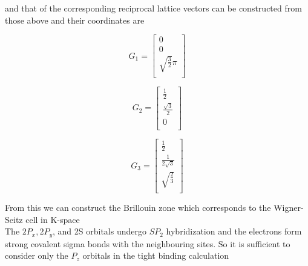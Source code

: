 \documentclass[a4paper]{article}
\begin{document}
    and that of the corresponding reciprocal lattice vectors can be constructed from those above and their coordinates are \\
    \begin{minipage}{0.3\textwidth}
        \centering
        \begin{equation*}
        G_1 =
        \begin{bmatrix}
            0 \\
            0 \\
            \sqrt{\frac{3}{2}}\pi \\
            
        \end{bmatrix}
        \end{equation*}
        
        \end{minipage}
        \begin{minipage}{0.3\textwidth}
        \centering
        \begin{equation*}
        G_2 =
        \begin{bmatrix}
            \frac{1}{2} \\
            \frac{\sqrt{3}}{2}  \\
            0 \\
        \end{bmatrix}
        \end{equation*}
        \end{minipage}
        \begin{minipage}{0.3\textwidth}
        \centering
        \begin{equation*}
        G_3 =
        \begin{bmatrix}
            \frac{1}{2} \\
            \frac{1}{2\sqrt{3}}  \\
            \sqrt{\frac{2}{3}} \\
        \end{bmatrix}
        \end{equation*}
        \end{minipage}
    
From this we can construct the Brillouin zone which corresponds to the Wigner-Seitz cell in K-space\\

The $2P_{x}, 2P_{y}$, and 2S orbitals undergo $SP_{2}$ hybridization and the electrons form strong covalent sigma bonds with the neighbouring sites. So it is sufficient to consider only the $P_{z}$ orbitals in the tight binding calculation
\end{document}
